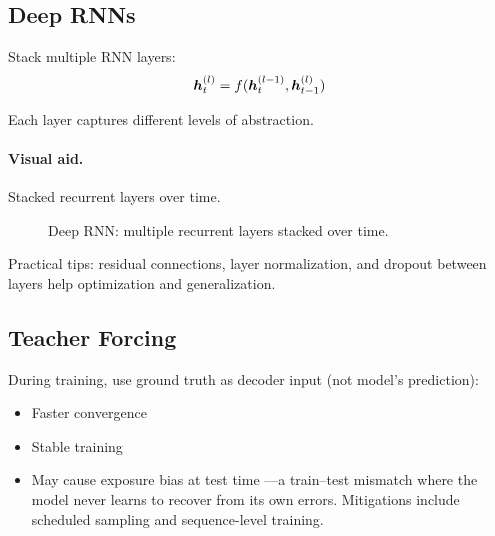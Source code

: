 \subsection{Deep RNNs}

Stack multiple RNN layers:
\begin{equation}
\boldsymbol{h}_t^{(l)} = f(\boldsymbol{h}_t^{(l-1)}, \boldsymbol{h}_{t-1}^{(l)})
\end{equation}

Each layer captures different levels of abstraction.

\paragraph{Visual aid.} Stacked recurrent layers over time.
\begin{figure}[h]
    \centering
    \caption{Deep RNN: multiple recurrent layers stacked over time.}
\end{figure}

Practical tips: residual connections, layer normalization, and dropout between layers help optimization and generalization.

\subsection{Teacher Forcing}

During training, use ground truth as decoder input (not model's prediction):
\begin{itemize}
    \item Faster convergence
    \item Stable training
    \item May cause exposure bias at test time
    \;—a train–test mismatch where the model never learns to recover from its own errors. Mitigations include scheduled sampling and sequence-level training.
\end{itemize}

